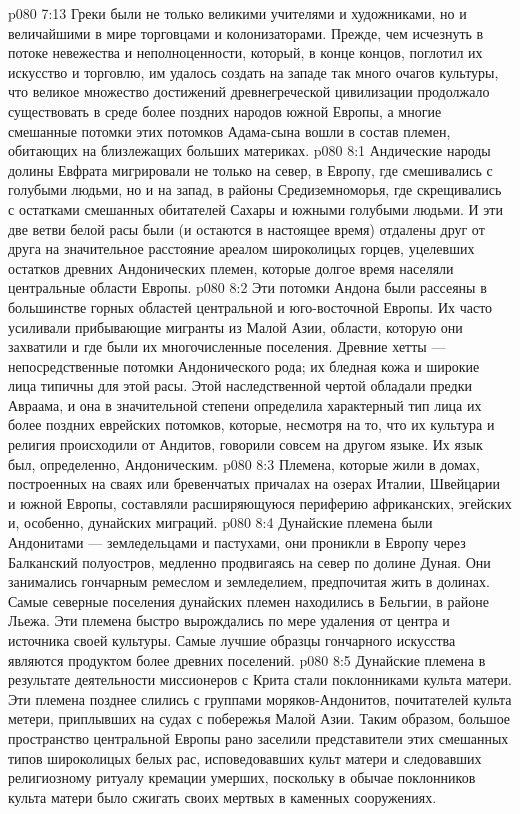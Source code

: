 \vs p080 7:13 \pc Греки были не только великими учителями и художниками, но и величайшими в мире торговцами и колонизаторами. Прежде, чем исчезнуть в потоке невежества и неполноценности, который, в конце концов, поглотил их искусство и торговлю, им удалось создать на западе так много очагов культуры, что великое множество достижений древнегреческой цивилизации продолжало существовать в среде более поздних народов южной Европы, а многие смешанные потомки этих потомков Адама\hyp{}сына вошли в состав племен, обитающих на близлежащих больших материках.
\vs p080 8:1 Андические народы долины Евфрата мигрировали не только на север, в Европу, где смешивались с голубыми людьми, но и на запад, в районы Средиземноморья, где скрещивались с остатками смешанных обитателей Сахары и южными голубыми людьми. И эти две ветви белой расы были (и остаются в настоящее время) отдалены друг от друга на значительное расстояние ареалом широколицых горцев, уцелевших остатков древних Андонических племен, которые долгое время населяли центральные области Европы.
\vs p080 8:2 Эти потомки Андона были рассеяны в большинстве горных областей центральной и юго\hyp{}восточной Европы. Их часто усиливали прибывающие мигранты из Малой Азии, области, которую они захватили и где были их многочисленные поселения. Древние хетты --- непосредственные потомки Андонического рода; их бледная кожа и широкие лица типичны для этой расы. Этой наследственной чертой обладали предки Авраама, и она в значительной степени определила характерный тип лица их более поздних еврейских потомков, которые, несмотря на то, что их культура и религия происходили от Андитов, говорили совсем на другом языке. Их язык был, определенно, Андоническим.
\vs p080 8:3 Племена, которые жили в домах, построенных на сваях или бревенчатых причалах на озерах Италии, Швейцарии и южной Европы, составляли расширяющуюся периферию африканских, эгейских и, особенно, дунайских миграций.
\vs p080 8:4 Дунайские племена были Андонитами --- земледельцами и пастухами, они проникли в Европу через Балканский полуостров, медленно продвигаясь на север по долине Дуная. Они занимались гончарным ремеслом и земледелием, предпочитая жить в долинах. Самые северные поселения дунайских племен находились в Бельгии, в районе Льежа. Эти племена быстро вырождались по мере удаления от центра и источника своей культуры. Самые лучшие образцы гончарного искусства являются продуктом более древних поселений.
\vs p080 8:5 Дунайские племена в результате деятельности миссионеров с Крита стали поклонниками культа матери. Эти племена позднее слились с группами моряков\hyp{}Андонитов, почитателей культа метери, приплывших на судах с побережья Малой Азии. Таким образом, большое пространство центральной Европы рано заселили представители этих смешанных типов широколицых белых рас, исповедовавших культ матери и следовавших религиозному ритуалу кремации умерших, поскольку в обычае поклонников культа матери было сжигать своих мертвых в каменных сооружениях.
